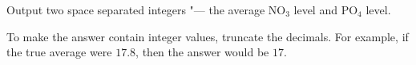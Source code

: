 Output two space separated integers "--- the average $\text{NO}_3$ level and $\text{PO}_4$ level.


To make the answer contain integer values, truncate the decimals. For example, if the true average were $17.8$, then the answer would be $17$.
